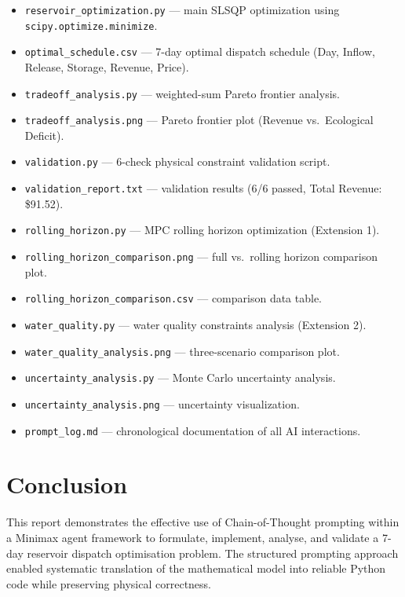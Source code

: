 \documentclass[12pt, a4paper]{article}
\begin{document}
\begin{itemize}[leftmargin=1.8em]
  \item \texttt{reservoir\_optimization.py} --- main SLSQP optimization using \texttt{scipy.optimize.minimize}.
  \item \texttt{optimal\_schedule.csv} --- 7-day optimal dispatch schedule (Day, Inflow, Release, Storage, Revenue, Price).
  \item \texttt{tradeoff\_analysis.py} --- weighted-sum Pareto frontier analysis.
  \item \texttt{tradeoff\_analysis.png} --- Pareto frontier plot (Revenue vs.\ Ecological Deficit).
  \item \texttt{validation.py} --- 6-check physical constraint validation script.
  \item \texttt{validation\_report.txt} --- validation results (6/6 passed, Total Revenue: \$91.52).
  \item \texttt{rolling\_horizon.py} --- MPC rolling horizon optimization (Extension 1).
  \item \texttt{rolling\_horizon\_comparison.png} --- full vs.\ rolling horizon comparison plot.
  \item \texttt{rolling\_horizon\_comparison.csv} --- comparison data table.
  \item \texttt{water\_quality.py} --- water quality constraints analysis (Extension 2).
  \item \texttt{water\_quality\_analysis.png} --- three-scenario comparison plot.
  \item \texttt{uncertainty\_analysis.py} --- Monte Carlo uncertainty analysis.
  \item \texttt{uncertainty\_analysis.png} --- uncertainty visualization.
  \item \texttt{prompt\_log.md} --- chronological documentation of all AI interactions.
\end{itemize}

\section{Conclusion}

This report demonstrates the effective use of Chain-of-Thought prompting within a Minimax agent framework to formulate, implement, analyse, and validate a 7-day reservoir dispatch optimisation problem. The structured prompting approach enabled systematic translation of the mathematical model into reliable Python code while preserving physical correctness.
\end{document}
